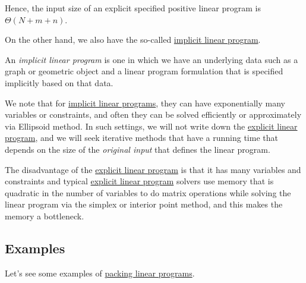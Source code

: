 \begin{remark}
	Hence, the input size of an explicit specified positive linear program is \(\Theta (N + m + n)\).
\end{remark}

On the other hand, we also have the so-called \hyperref[def:implicit-LP]{implicit linear program}.

\begin{definition}\label{def:implicit-LP}
	An \emph{implicit linear program} is one in which we have an underlying data such as a graph or geometric object and a linear program formulation that is specified implicitly based on that data.
\end{definition}

We note that for \hyperref[def:implicit-LP]{implicit linear programs}, they can have exponentially many variables or constraints, and often they can be solved efficiently or approximately via Ellipsoid method. In such settings, we will not write down the \hyperref[def:explicit-LP]{explicit linear program}, and we will seek iterative methods that have a running time that depends on the size of the \emph{original input} that defines the linear program.

\begin{note}
	The disadvantage of the \hyperref[def:explicit-LP]{explicit linear program} is that it has many variables and constraints and typical \hyperref[def:explicit-LP]{explicit linear program} solvers use memory that is quadratic in the number of variables to do matrix operations while solving the linear program via the simplex or interior point method, and this makes the memory a bottleneck.
\end{note}

\subsection{Examples}
Let's see some examples of \hyperref[def:packing-LP]{packing linear programs}.

